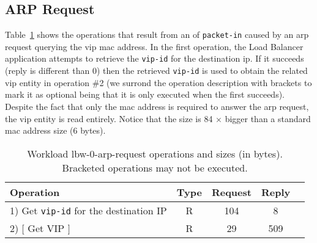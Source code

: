 \subsection{ARP Request}
Table~\ref{table:lbw-0-arp-request}  shows the operations that result from an \gls{of} \texttt{packet-in} caused by an \gls{arp} request querying the  \gls{vip} \gls{mac} address. 
In the first operation, the Load Balancer application attempts to retrieve the \texttt{vip-id} for the destination \gls{ip}. If it succeeds (reply is different than 0) then the retrieved \texttt{vip-id} is used to obtain the related \gls{vip} entity in operation \#2 (we surrond the operation description with brackets to mark it as optional being that it is only executed when the first succeeds). 
Despite the fact that only the \gls{mac} address is required to answer the \gls{arp} request, the \gls{vip} entity is read entirely. Notice that the size is 84 $\times$ bigger than a standard \gls{mac} address size (6 bytes). 

\begin{table}[ht]
\small
\centering 
\begin{tabular}{l c c c c}
Operation & Type & Request & Reply \\ \toprule 
1) Get \texttt{vip-id} for the destination IP  & R & 104 & 8\\
2) $[$ Get VIP $]$  & R & 29 & 509 \\\bottomrule
\end{tabular}\caption[Workload lbw-0-arp-request operations]{Workload lbw-0-arp-request operations and sizes (in bytes). Bracketed operations may not be executed.}
\label{table:lbw-0-arp-request}
\end{table}

\vspace{-5pt}
